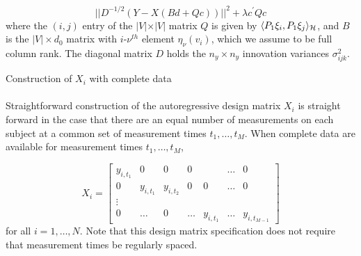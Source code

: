 \begin{equation} \label{eq:ar-design-matrix-1}
\vert \vert D^{-1/2}\left( Y - X \left( Bd + Qc \right) \right) \vert \vert^2  + \lambda c^\prime Q c 
\end{equation}
\noindent
where the $\left(i,j\right)$ entry of the $\vert V \vert \times \vert V \vert$ matrix $Q$ is given by $\langle P_1 \xi_i,  P_1 \xi_j \rangle_{\mathcal{H}}$, and $B$ is the $\vert V \vert \times d_0$ matrix with $i$-$\nu^{th}$ element $\eta_\nu\left(v_i\right)$, which we assume to be full column rank.  The diagonal matrix $D$ holds the $n_y \times n_y$  innovation variances $\sigma^2_{ijk}$. 

\bigskip

\begin{example}{Construction of $X_i$ with complete data} 
\\
\vspace{.5cm} 
\\
Straightforward construction of the autoregressive design matrix $X_i$ is straight forward in the case that there are an equal number of measurements on each subject at a common set of measurement times $t_1,\dots, t_M$. When complete data are available for measurement times $t_1, \dots, t_M$, 

\begin{equation}
X_i =  \begin{bmatrix} 
y_{i, t_1} & 0 & 0 &0&& \dots & 0 \\
 0 & y_{i, t_1} &  y_{i, t_2}&0 &0& \dots & 0 \\
 \vdots &&&&&&\\
 0 & \dots &0 & \dots& y_{i,t_1} & \dots &  y_{i, t_{M-1}}
\end{bmatrix}
\end{equation}
\noindent
for all $i = 1,\dots, N$. Note that this design matrix specification does not require that measurement times be regularly spaced.  
\end{example}

